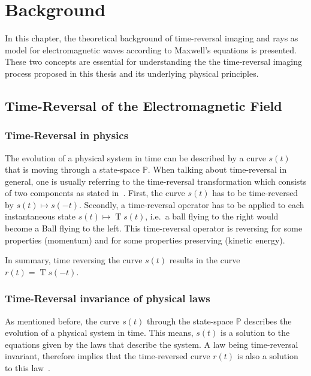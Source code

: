 
\chapter{Background}\label{chapter:background}
In this chapter, the theoretical background of time-reversal imaging and rays as model for electromagnetic waves according to Maxwell's equations is presented.
These two concepts are essential for understanding the the time-reversal imaging process proposed in this thesis and its underlying physical principles. 

\section{Time-Reversal of the Electromagnetic Field}
\subsection{Time-Reversal in physics}
The evolution of a physical system in time can be described by a curve \(s(t)\) that is moving through a state-space \(\mathbb{P}\).
When talking about time-reversal in general, one is usually referring to the time-reversal transformation which consists of two components as stated in~\parencite{roberts_reversing_2022}.
First, the curve \(s(t)\) has to be time-reversed by \(s(t) \mapsto s(-t)\).
Secondly, a time-reversal operator has to be applied to each instantaneous state \(s(t) \mapsto \operatorname{T}s(t)\), i.e.\ a ball flying to the right would become a Ball flying to the left.
This time-reversal operator is reversing for some properties (momentum) and for some properties preserving (kinetic energy).


In summary, time reversing the curve \(s(t)\) results in the curve \(r(t)=\operatorname{T}s(-t)\). 



\subsection{Time-Reversal invariance of physical laws}
As mentioned before, the curve \(s(t)\) through the state-space \(\mathbb{P}\) describes the evolution of a physical system in time.
This means, \(s(t)\) is a solution to the equations given by the laws that describe the system. 
A law being time-reversal invariant, therefore implies that the time-reversed curve \(r(t)\) is also a solution to this law~\parencite{roberts_time_2021}.

